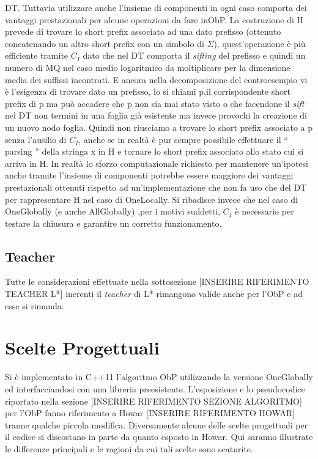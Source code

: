 \ac{DT}. Tuttavia utilizzare anche l'insieme di componenti in ogni caso comporta dei vantaggi prestazionali per alcune operazioni da fare in\ac{ObP}. La costruzione di \ac{H} prevede di trovare lo short prefix associato ad una dato prefisso (ottenuto concatenando un altro short prefix con un simbolo di $\Sigma$), quest'operazione è più efficiente tramite $C_{I}$ dato che nel \ac{DT} comporta il \textit{sifting} del prefisso e quindi un numero di \ac{MQ} nel caso medio logaritmico  da moltiplicare per la dimensione media dei suffissi incontrati. E ancora nella decomposizione del controesempio vi è l'esigenza di trovare dato un prefisso, lo si chiami p,il corrispondente short prefix di p ma può accadere che p non sia mai stato visto o che facendone il \textit{sift} nel \ac{DT} non termini in una foglia già esistente ma invece provochi la creazione di un nuovo nodo foglia. Quindi non riusciamo a trovare lo short prefix associato a p senza l'ausilio di $C_I$, anche se in realtà è pur sempre possibile effettuare il  `` parsing  '' della stringa x in \ac{H} e tornare lo short prefix associato allo stato cui si arriva in \ac{H}. In realtà lo sforzo computazionale richiesto per mantenere un'ipotesi anche tramite l'insieme di componenti potrebbe essere maggiore dei vantaggi prestazionali ottenuti rispetto ad un'implementazione che non fa uso che del \ac{DT} per rappresentare \ac{H} nel caso di OneLocally. Si ribadisce invece che nel caso di OneGlobally  (e anche AllGlobally) ,per i motivi suddetti, $C_I$ è necessario per testare la chiusura e garantire un corretto funzionamento.
\subsection{Teacher} Tutte le considerazioni effettuate nella sottosezione [INSERIRE RIFERIMENTO TEACHER L*] inerenti il \textit{teacher} di L* rimangono valide anche per l'\ac{ObP} e ad esse si rimanda.  
 
\section{Scelte Progettuali} Si è implementato in C++11 l'algoritmo \ac{ObP} utilizzando la versione OneGlobally ed interfacciandosi con una libreria preesistente. L'esposizione e lo pseudocodice riportato nella sezione [INSERIRE RIFERIMENTO SEZIONE ALGORITMO] per l'\ac{ObP} fanno riferimento a Howar [INSERIRE RIFERIMENTO HOWAR] tranne qualche piccola modifica. Diversamente alcune delle scelte   progettuali per il codice  si discostano in parte da quanto esposto in Howar. Qui saranno illustrate le differenze principali e le ragioni da cui tali scelte sono scaturite.

